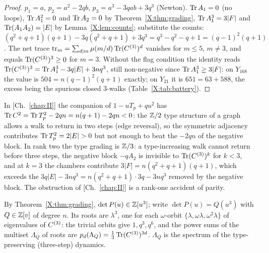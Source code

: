 \begin{proof}
$p_1=a$, $p_2=a^{2}-2qb$, $p_3=a^{3}-3qab+3q^{3}$ (Newton). $\operatorname{Tr} A_1=0$ (no loops),
$\operatorname{Tr} A_1^{2}=0$ and $\operatorname{Tr} A_2=0$ by Theorem~\ref{X:thm:grading}, $\operatorname{Tr} A_1^{3}=3|F|$ and
$\operatorname{Tr}(A_1A_2)=|E|$ by Lemma~\ref{X:lem:counts}; substitute the counts:
$(q^{2}+q+1)(q+1)-3q(q^{2}+q+1)+3q^{3}=q^{3}-q^{2}-q+1=(q-1)^{2}(q+1)$. The net trace
$\operatorname{tr}_m=\sum_{d\mid m}\mu(m/d)\operatorname{Tr}(C^{(3)})^{d}$ vanishes for $m\le5$, $m\neq3$, and equals
$\operatorname{Tr}(C^{(3)})^{3}\ge0$ for $m=3$. Without the flag condition the identity reads
$\operatorname{Tr}(C^{(3)})^{3}=\operatorname{Tr} A_1^{3}-3q|E|+3nq^{3}$, still non-negative since $\operatorname{Tr} A_1^{3}\ge3|F|$:
on $Y_{168}$ the value is $504=n(q-1)^{2}(q+1)$ exactly; on $Y_{21}$ it is $651=63+588$,
the excess being the spurious closed $3$-walks (Table~\ref{X:tab:battery}).
\end{proof}

\begin{remark}\label{X:rem:why}
In [Ch.~\ref{chap:II}] the companion of $1-uT_p+qu^{2}$ has $\operatorname{Tr} C^{2}=\operatorname{Tr} T_p^{2}-2qn=n(q+1)-2qn<0$:
the $\mathbb{Z}/2$ type structure of a graph allows a walk to return in two steps (edge reversal),
so the symmetric adjacency contributes $\Tr T_p^{2}=2|E|>0$ but not enough to beat the
$-2qn$ of the negative block. In rank two the type grading is $\mathbb{Z}/3$: a type-increasing walk
cannot return before three steps, the negative block $-qA_2$ is invisible to
$\operatorname{Tr}(C^{(3)})^{k}$ for $k<3$, and at $k=3$ the chambers contribute $3|F|=n(q^{2}+q+1)(q+1)$,
which exceeds the $3q|E|-3nq^{3}=n(q^{2}+q+1)\cdot3q-3nq^{3}$ removed by the negative block.
The obstruction of [Ch.~\ref{chap:II}] is a rank-one accident of parity.
\end{remark}

\begin{definition}\label{X:def:reduced}
By Theorem~\ref{X:thm:grading}, $\det P(u)\in\mathbb{Z}[u^{3}]$; write $\det P(u)=Q(u^{3})$ with
$Q\in\mathbb{Z}[v]$ of degree $n$. Its roots are $\lambda^{3}$, one for each $\omega$-orbit
$\{\lambda,\omega\lambda,\omega^{2}\lambda\}$ of eigenvalues of $C^{(3)}$: the trivial orbits
give $1,q^{3},q^{6}$, and the power sums of the multiset $\Lambda_Q$ of roots are
$p_d(\Lambda_Q)=\tfrac13\operatorname{Tr}(C^{(3)})^{3d}$. $\Lambda_Q$ is the spectrum of the
type-preserving (three-step) dynamics.
\end{definition}

